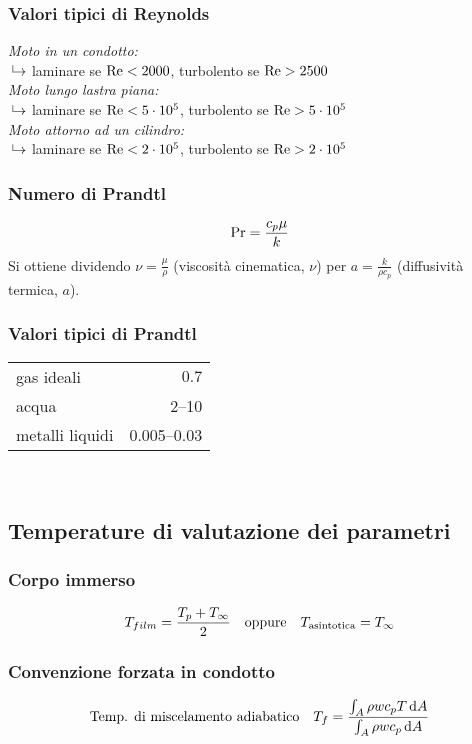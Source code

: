 \subsubsection{Valori tipici di Reynolds}
\textit{Moto in un condotto:}\\
\phantom{→}$\put(3,2){\line(0,1){5}}\to$ laminare se $\operatorname{Re} < 2000$, turbolento se $\operatorname{Re} > 2500$\\
\textit{Moto lungo lastra piana:}\\
\phantom{→}$\put(3,2){\line(0,1){5}}\to$ laminare se $\operatorname{Re} < 5 \cdot 10^5$, turbolento se $\operatorname{Re} > 5 \cdot 10^5$\\
\textit{Moto attorno ad un cilindro:}\\
\phantom{→}$\put(3,2){\line(0,1){5}}\to$ laminare se $\operatorname{Re} < 2 \cdot 10^5$, turbolento se $\operatorname{Re} > 2 \cdot 10^5$\\

\subsubsection{Numero di Prandtl}
\[ \operatorname{Pr} = \frac{c_p \mu}{k} \]
Si ottiene dividendo $\nu = \frac{\mu}{\rho}$ (viscosità cinematica, $\nu$) per $a = \frac{k}{\rho c_p}$ (diffusività termica, $a$).

\subsubsection{Valori tipici di Prandtl}
\begin{tabular}{p{3cm}r}
    \toprule
    gas ideali & $0.7$\\
    acqua & \numrange{2}{10}\\
    metalli liquidi & \numrange{0.005}{0.03}\\
    \bottomrule
\end{tabular}\\

\subsection{Temperature di valutazione dei parametri}
\subsubsection{Corpo immerso}
\[ T_{film} = \frac{T_p + T_\infty}{2} \qq{oppure} T_{\text{asintotica}} = T_\infty \]
\subsubsection{Convenzione forzata in condotto}
\[ \qq*{Temp. di miscelamento adiabatico} T_f = \frac{\int_A \rho w c_p T \dd{A}}{\int_A \rho w c_p \dd{A}} \]

